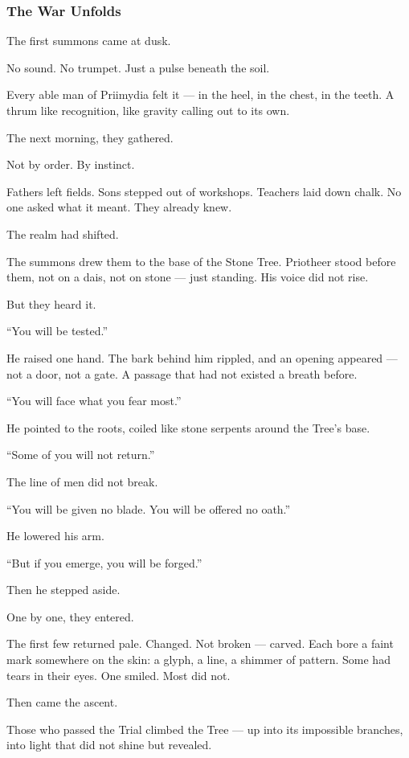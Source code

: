\documentclass[12pt]{article}
\begin{document}
\subsubsection{The War Unfolds}

The first summons came at dusk.

No sound. No trumpet. Just a pulse beneath the soil.

Every able man of Priimydia felt it — in the heel, in the chest, in the teeth. A thrum like recognition, like gravity calling out to its own.

The next morning, they gathered.

Not by order. By instinct.

Fathers left fields. Sons stepped out of workshops. Teachers laid down chalk. No one asked what it meant. They already knew.

The realm had shifted.

The summons drew them to the base of the Stone Tree. Priotheer stood before them, not on a dais, not on stone — just standing. His voice did not rise.

But they heard it.

``You will be tested.''

He raised one hand. The bark behind him rippled, and an opening appeared — not a door, not a gate. A passage that had not existed a breath before.

``You will face what you fear most.''

He pointed to the roots, coiled like stone serpents around the Tree’s base.

``Some of you will not return.''

The line of men did not break.

``You will be given no blade. You will be offered no oath.''

He lowered his arm.

``But if you emerge, you will be forged.''

Then he stepped aside.

One by one, they entered.

The first few returned pale. Changed. Not broken — carved. Each bore a faint mark somewhere on the skin: a glyph, a line, a shimmer of pattern. Some had tears in their eyes. One smiled. Most did not.

Then came the ascent.

Those who passed the Trial climbed the Tree — up into its impossible branches, into light that did not shine but revealed.
\end{document}
